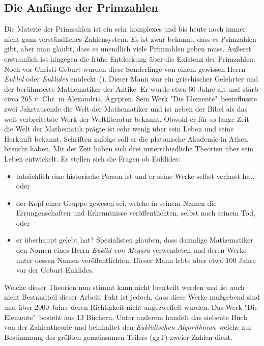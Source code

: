 \documentclass[12pt,a4paper]{article}
\theoremstyle{definition}
\begin{document}
\subsection{Die Anfänge der Primzahlen}\label{Die Anfänge der Primzahlen}
Die Materie der Primzahlen ist ein sehr komplexes und bis heute noch immer nicht ganz verständliches Zahlensystem.
Es ist zwar bekannt, dass es Primzahlen gibt, aber man glaubt, dass es unendlich viele Primzahlen geben muss.
Äußerst erstaunlich ist hingegen die frühe Entdeckung über die Existenz der Primzahlen.
Noch vor Christi Geburt wurden diese Sonderlinge von einem gewissen Herrn \textit{Euklid} oder \textit{Euklides} entdeckt (\cite[22]{Remmert1995}).
Dieser Mann war ein griechischer Gelehrter und der berühmteste Mathematiker der Antike.
Er wurde etwa 60 Jahre alt und starb circa 265 v. Chr. in Alexandria, Ägypten.
Sein Werk "Die Elemente"\ beeinflusste zwei Jahrtausende die Welt der Mathematiker und ist neben der Bibel als das weit verbreitetste Werk der Weltliteratur bekannt.
Obwohl er für so lange Zeit die Welt der Mathematik prägte ist sehr wenig über sein Leben und seine Herkunft bekannt.
Schriften zufolge soll er die platonische Akademie in Athen besucht haben.
Mit der Zeit haben sich drei unterschiedliche Theorien über sein Leben entwickelt.
Es stellen sich die Fragen ob Euklides:
\begin{itemize}
\item tatsächlich eine historische Person ist und er seine Werke selbst verfasst hat, oder
\item der Kopf einer Gruppe gewesen sei, welche in seinem Namen die Errungenschaften und Erkenntnisse veröffentlichten, selbst nach seinem Tod, oder
\item er überhaupt gelebt hat?
Spezialisten glauben, dass damalige Mathematiker den Namen eines Herrn \textit{Euklid von Megara} verwendeten und deren Werke unter dessen Namen veröffentlichten.
Dieser Mann lebte aber etwa 100 Jahre vor der Geburt Euklides.
\end{itemize}
Welche dieser Theorien nun stimmt kann nicht beurteilt werden und ist auch nicht Bestandteil dieser Arbeit.
Fakt ist jedoch, dass diese Werke maßgebend sind und über 2000 Jahre deren Richtigkeit nicht angezweifelt wurden.
Das Werk "Die Elemente"\ besteht aus 13 Büchern.
Unter anderem handelt das siebente Buch von der Zahlentheorie und beinhaltet den \textit{Euklidischen Algorithmus}, welche zur Bestimmung des größten gemeinsamen Teilers (ggT) zweier Zahlen dient.
\end{document}
